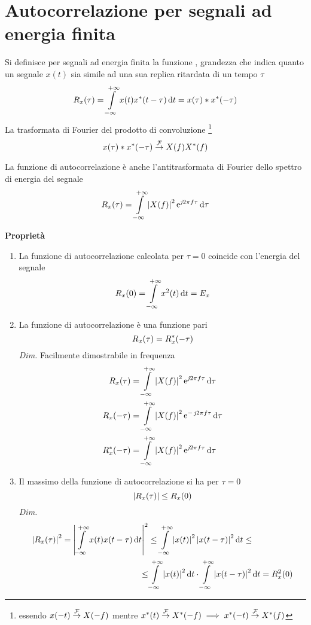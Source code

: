 \section{Autocorrelazione per segnali ad energia finita}
Si definisce per segnali ad energia finita la funzione , grandezza che indica quanto un segnale $x(t)$ sia simile ad una sua replica ritardata di un tempo $\tau$
\begin{equation}R_x(\tau)=\int\limits_{-\infty}^{+\infty}{x(t){x}^\ast(t-\tau)}{\,\mathop{}\!\mathrm{d}{t}}=x(\tau)\ast {x}^\ast(-\tau)\end{equation}
La trasformata di Fourier del prodotto di convoluzione \footnote{essendo $x(-t)\overset{\operatorname{\mathcal{F}}}{\to}X(-f)$ mentre ${x}^\ast(t)\overset{\operatorname{\mathcal{F}}}{\to}{X}^\ast(-f) \implies {x}^\ast(-t)\overset{\operatorname{\mathcal{F}}}{\to}{X}^\ast(f)$
}
\[x(\tau)\ast {x}^\ast(-\tau)\overset{\operatorname{\mathcal{F}}}{\to}X(f){X}^\ast(f)\]

La funzione di autocorrelazione è anche l'antitrasformata di Fourier dello spettro di energia del segnale
\begin{equation}
R_x(\tau)=\int\limits_{-\infty}^{+\infty}{\left|{X(f)}\right|^2\operatorname{e}^{\operatorname{\mathit{j}\!} 2\pi f\tau}}{\,\mathop{}\!\mathrm{d}{\tau}}
\end{equation}

\textbf{Proprietà}
\begin{enumerate}
\item La funzione di autocorrelazione calcolata per $\tau=0$ coincide con l'energia del segnale
\[R_x(0)=\int\limits_{-\infty}^{+\infty}{x^2(t)}{\,\mathop{}\!\mathrm{d}{t}}=E_x\]
\item La funzione di autocorrelazione è una funzione pari
\[R_x(\tau)=R_{x}^\ast(-\tau)\]
\emph{Dim.} Facilmente dimostrabile in frequenza 
\[\begin{split}R_x(\tau)&=\int\limits_{-\infty}^{+\infty}{\left|{X(f)}\right|^2\operatorname{e}^{\operatorname{\mathit{j}\!} 2\pi f\tau}}{\,\mathop{}\!\mathrm{d}{\tau}}\\
R_x(-\tau)&=\int\limits_{-\infty}^{+\infty}{\left|{X(f)}\right|^2\operatorname{e}^{-\operatorname{\mathit{j}\!} 2\pi f\tau}}{\,\mathop{}\!\mathrm{d}{\tau}}\\
R_{x}^\ast(-\tau)&=\int\limits_{-\infty}^{+\infty}{\left|{X(f)}\right|^2\operatorname{e}^{\operatorname{\mathit{j}\!} 2\pi f\tau}}{\,\mathop{}\!\mathrm{d}{\tau}}\end{split}\]
\item Il massimo della funzione di autocorrelazione si ha per $\tau=0$
\[\left|{R_x(\tau)}\right|\leq R_x(0)\]
\emph{Dim.}
\[\begin{split}\left|{R_x(\tau)}\right|^2=\left|{\int\limits_{-\infty}^{+\infty}{x(t)x(t-\tau)}{\,\mathop{}\!\mathrm{d}{t}}}\right|^2&\leq\int\limits_{-\infty}^{+\infty}{\left|{x(t)}\right|^2\left|{x(t-\tau)}\right|^2}{\,\mathop{}\!\mathrm{d}{t}}\leq\\\leq&\int\limits_{-\infty}^{+\infty}{\left|{x(t)}\right|^2}{\,\mathop{}\!\mathrm{d}{t}}\cdot\int\limits_{-\infty}^{+\infty}{\left|{x(t-\tau)}\right|^2}{\,\mathop{}\!\mathrm{d}{t}}=R_x^2(0)\end{split}\]
\end{enumerate}

